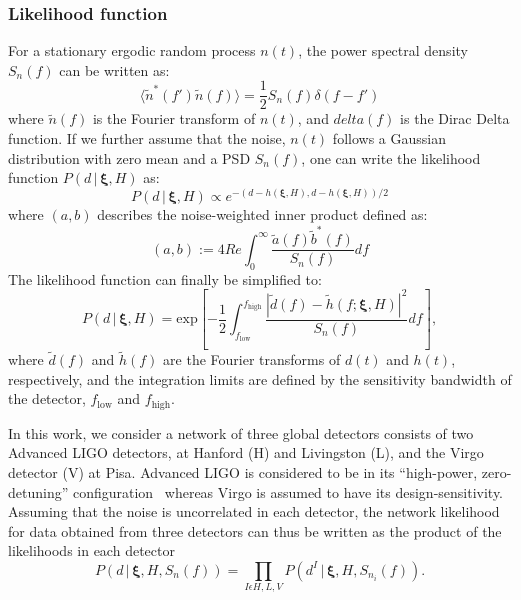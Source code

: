 \documentclass[prd,preprintnumbers,twocolumn,eqsecnum,floatfix,a4paper,nofootinbib,superscriptaddress]{revtex4}
\newcommand{\bxi}{\bm{\xi}}
\begin{document}
\subsubsection{Likelihood function}
For a stationary ergodic random process $n(t)$, the power spectral density $S_n(f)$ can be written as:
\begin{equation}
\langle \tilde{n}^*(f')\tilde{n}(f)\rangle = \frac{1}{2}S_n(f)\delta(f-f')
\end{equation}
where $\tilde{n}(f)$ is the Fourier transform of $n(t)$, and $delta(f)$ is the Dirac Delta function. If we further assume that the noise, $n(t)$ follows a Gaussian distribution with zero mean and a PSD $S_n(f)$, one can write the likelihood function $P (d \, | \, {\bxi}, H) $ as:
\begin{equation}
P (d \, | \, {\bxi}, H) \propto e^{-(d -h({\bxi},H), d-h({\bxi},H))/2}
\end{equation}
where $(a,b)$ describes the noise-weighted inner product defined as:
\begin{equation}
(a,b) := 4Re \int_0^{\infty} \frac{\tilde{a}(f)\tilde{b}^*(f)}{S_n(f)}df
\end{equation}
The likelihood function can finally be simplified to:
\begin{equation}
P (d \, | \, {\bxi}, H) = \text{exp}\left[ -\frac{1}{2}\int_{f_\mathrm{low}}^{f_\mathrm{high}} \frac{|\tilde{d}(f) - \tilde{h}(f;{\bxi}, H)|^2}{S_n(f)}df\right],
\end{equation}
where $\tilde{d}(f)$ and $\tilde{h}(f)$ are the Fourier transforms of $d(t)$ and $h(t)$, respectively, and the integration limits are defined by the sensitivity bandwidth of the detector, $f_\mathrm{low}$ and $f_\mathrm{high}$.

In this work, we consider a network of three global detectors consists of two Advanced LIGO detectors, at Hanford (H) and Livingston (L), and the Virgo detector (V) at Pisa. Advanced LIGO is considered to be in its ``high-power, zero-detuning'' configuration~\cite{aLIGOZeroDetHighPower} whereas Virgo is assumed to have its design-sensitivity. Assuming that the noise is uncorrelated in each detector, the network likelihood for data obtained from three detectors can thus be written as the product of the likelihoods in each detector
\begin{equation}
P (d \, | \, {\bxi}, H, S_n(f)) = \prod_{I \epsilon {H,L,V}} P (d^{I} \, | \, {\bxi}, H, S_{n_{i}}(f)).
\end{equation}
\end{document}
